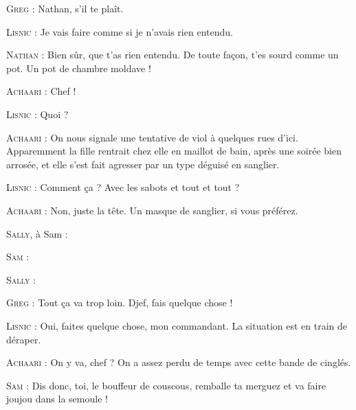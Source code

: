 \begin{dialogue}
\textsc{Greg} : Nathan, s’il te plaît.

\textsc{Lisnic} : Je vais faire comme si je n’avais rien entendu.

\textsc{Nathan} : Bien sûr, que t’as rien entendu. De toute façon, t’es sourd comme un pot. Un pot de chambre moldave !

\textsc{Achaari} : Chef !

\textsc{Lisnic} : Quoi ?

\textsc{Achaari} : On nous signale une tentative de viol à quelques rues d’ici. Apparemment la fille rentrait chez elle en maillot de bain, après une soirée bien arrosée, et elle s’est fait agresser par un type déguisé en sanglier.

\textsc{Lisnic} : Comment ça ? Avec les sabots et tout et tout ?

\textsc{Achaari} : Non, juste la tête. Un masque de sanglier, si vous préférez.

\textsc{Sally}, à Sam : 

\textsc{Sam} : 

\textsc{Sally} : 

\textsc{Greg} : Tout ça va trop loin. Djef, fais quelque chose !

\textsc{Lisnic} : Oui, faites quelque chose, mon commandant. La situation est en train de déraper.

\textsc{Achaari} : On y va, chef ? On a assez perdu de temps avec cette bande de cinglés.

\textsc{Sam} : Dis donc, toi, le bouffeur de couscous, remballe ta merguez et va faire joujou dans la semoule !


\end{dialogue}
